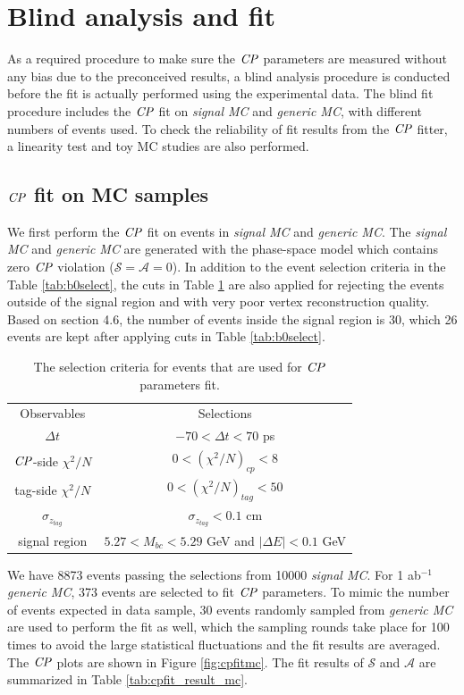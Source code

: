 \section{Blind analysis and fit}
As a required procedure to make sure the $\it{CP}$ parameters are measured without any bias due to the preconceived results, a blind analysis procedure is conducted before the fit is actually performed using the experimental data. The blind fit procedure includes the $\it{CP}$ fit on \textit{signal MC} and \textit{generic MC}, with different numbers of events used. To check the reliability of fit results from the $\it{CP}$ fitter, a linearity test and toy MC studies are also performed. 

\subsection{$\it{CP}$ fit on MC samples}
We first perform the $\it{CP}$ fit on events in \textit{signal MC} and \textit{generic MC}.
The \textit{signal MC} and \textit{generic MC} are generated with the phase-space model which contains zero $\it{CP}$ violation ($\mathcal{S}=\mathcal{A}=0$). In addition to the event selection criteria in the Table \ref{tab:b0select}, the cuts in Table \ref{tab:cutCP} are also applied for rejecting the events outside of the signal region and with very poor vertex reconstruction quality. Based on section 4.6, the number of events inside the signal region is 30, which 26 events are kept after applying cuts in Table \ref{tab:b0select}.
\begin{table}
	\centering
	\caption{The selection criteria for events that are used for $\it{CP}$ parameters fit.}
	\label{tab:cutCP}
\begin{tabular}{c|c}
	\hline
	Observables & Selections \\
	$\Delta t$ & $-70 < \Delta t < 70$ ps\\
	$\it{CP}$-side $\chi^2/N$ & $0 < (\chi^2/N)_{cp} < 8 $ \\
	tag-side $\chi^2/N$  & $0 < (\chi^2/N)_{tag} < 50 $\\
	$\sigma_{z_{tag}}$ &  $\sigma_{z_{tag}} < 0.1$ cm\\
	signal region & $5.27 < M_{bc} < 5.29$ GeV and $|\Delta E| < 0.1$ GeV\\
	\hline
\end{tabular}
\end{table}

We have 8873 events passing the selections from 10000 \textit{signal MC}. For 1 ab$^{-1}$ \textit{generic MC}, 373 events are selected to fit $\it{CP}$ parameters. To mimic the number of events expected in data sample, 30 events randomly sampled from \textit{generic MC} are used to perform the fit as well, which the sampling rounds take place for 100 times to avoid the large statistical fluctuations and the fit results are averaged. The $\it{CP}$ plots are shown in Figure \ref{fig:cpfitmc}. The fit results of $\mathcal{S}$ and $\mathcal{A}$ are summarized in Table \ref{tab:cpfit_result_mc}.

